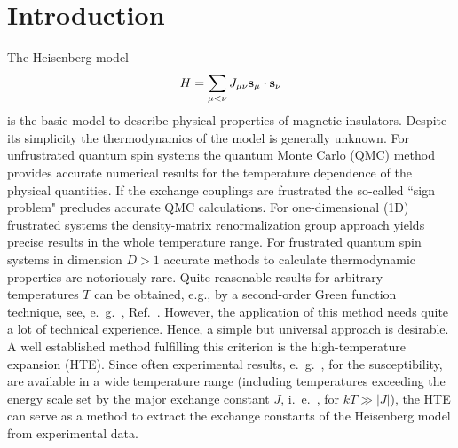\documentclass[aps,twocolumn,groupedaddress]{revtex4}
\begin{document}
\section{Introduction}\label{sec:I}
The Heisenberg model
\begin{equation}\label{model}
H=\sum_{\mu <\nu} J_{\mu \nu} {\bf s}_\mu \cdot {\bf s}_\nu
\end{equation}
is the basic model to describe physical properties of magnetic
insulators. Despite its simplicity the thermodynamics of the model
is generally unknown. For unfrustrated quantum spin systems the
quantum Monte Carlo (QMC) method provides accurate numerical results
for the temperature dependence of the physical quantities. If the
exchange couplings are frustrated the so-called ``sign problem"
precludes accurate QMC calculations\cite{TrWi05}. For
one-dimensional (1D) frustrated systems the density-matrix
renormalization group approach\cite{schollwoeck} yields precise
results in the whole temperature range. For frustrated quantum spin
systems in dimension $D>1$ accurate methods to calculate
thermodynamic properties are notoriously rare. Quite reasonable
results for arbitrary temperatures $T$ can be obtained, e.g., by a
second-order Green function technique, see, e.~g.~,
Ref.~. However, the application of
this method needs quite a lot of technical experience. Hence, a
simple but universal approach is desirable. A well established
method fulfilling this criterion is the high-temperature expansion
(HTE).  Since often experimental results, e.~g.~, for the
susceptibility, are available in a wide temperature range (including
temperatures exceeding the energy scale set by the major exchange
constant $J$, i.~e.~, for $k T\gg |J|$), the HTE can serve as a
method to extract the exchange constants of the Heisenberg model
from experimental data.
\end{document}
